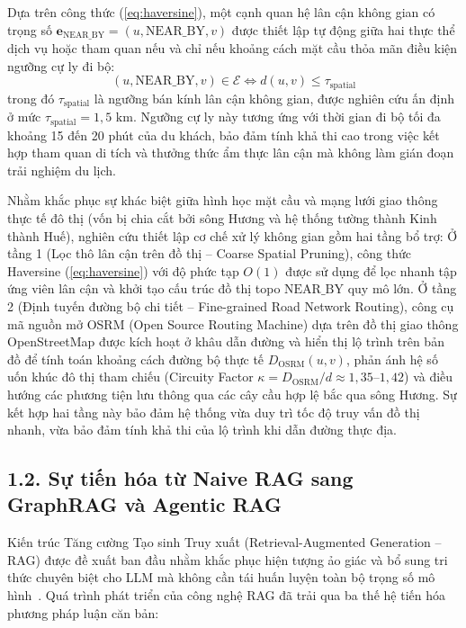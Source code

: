 Dựa trên công thức (\ref{eq:haversine}), một cạnh quan hệ lân cận không gian có trọng số $\mathbf{e}_{\text{NEAR\_BY}} = (u, \text{NEAR\_BY}, v)$ được thiết lập tự động giữa hai thực thể dịch vụ hoặc tham quan nếu và chỉ nếu khoảng cách mặt cầu thỏa mãn điều kiện ngưỡng cự ly đi bộ:
\begin{equation}
    (u, \text{NEAR\_BY}, v) \in \mathcal{E} \iff d(u, v) \le \tau_{\text{spatial}}
    \label{eq:spatial-threshold}
\end{equation}
trong đó $\tau_{\text{spatial}}$ là ngưỡng bán kính lân cận không gian, được nghiên cứu ấn định ở mức $\tau_{\text{spatial}} = 1{,}5\text{ km}$. Ngưỡng cự ly này tương ứng với thời gian đi bộ tối đa khoảng 15 đến 20 phút của du khách, bảo đảm tính khả thi cao trong việc kết hợp tham quan di tích và thưởng thức ẩm thực lân cận mà không làm gián đoạn trải nghiệm du lịch.

Nhằm khắc phục sự khác biệt giữa hình học mặt cầu và mạng lưới giao thông thực tế đô thị (vốn bị chia cắt bởi sông Hương và hệ thống tường thành Kinh thành Huế), nghiên cứu thiết lập cơ chế xử lý không gian gồm hai tầng bổ trợ:
Ở tầng 1 (Lọc thô lân cận trên đồ thị -- Coarse Spatial Pruning), công thức Haversine (\ref{eq:haversine}) với độ phức tạp $O(1)$ được sử dụng để lọc nhanh tập ứng viên lân cận và khởi tạo cấu trúc đồ thị topo $\text{NEAR\_BY}$ quy mô lớn. 
Ở tầng 2 (Định tuyến đường bộ chi tiết -- Fine-grained Road Network Routing), công cụ mã nguồn mở OSRM (Open Source Routing Machine) dựa trên đồ thị giao thông OpenStreetMap được kích hoạt ở khâu dẫn đường và hiển thị lộ trình trên bản đồ để tính toán khoảng cách đường bộ thực tế $D_{\text{OSRM}}(u, v)$, phản ánh hệ số uốn khúc đô thị tham chiếu (Circuity Factor $\kappa = D_{\text{OSRM}} / d \approx 1{,}35\text{--}1{,}42$) và điều hướng các phương tiện lưu thông qua các cây cầu hợp lệ bắc qua sông Hương. Sự kết hợp hai tầng này bảo đảm hệ thống vừa duy trì tốc độ truy vấn đồ thị nhanh, vừa bảo đảm tính khả thi của lộ trình khi dẫn đường thực địa.

\subsection*{1.2. Sự tiến hóa từ Naive RAG sang GraphRAG và Agentic RAG}
{}

Kiến trúc Tăng cường Tạo sinh Truy xuất (Retrieval-Augmented Generation -- RAG) được đề xuất ban đầu nhằm khắc phục hiện tượng ảo giác và bổ sung tri thức chuyên biệt cho LLM mà không cần tái huấn luyện toàn bộ trọng số mô hình~\cite{lewis2020rag}. Quá trình phát triển của công nghệ RAG đã trải qua ba thế hệ tiến hóa phương pháp luận căn bản:

